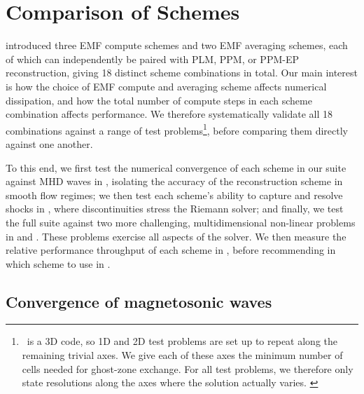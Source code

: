 \section{Comparison of Schemes}
\label{sec:scheme-comparisons}

 introduced three EMF compute schemes and two EMF averaging schemes, each of which can independently be paired with PLM, PPM, or PPM-EP reconstruction, giving 18 distinct scheme combinations in total. Our main interest is how the choice of EMF compute and averaging scheme affects numerical dissipation, and how the total number of compute steps in each scheme combination affects performance. We therefore systematically validate all 18 combinations against a range of test problems\footnote{
    \quokka~is a 3D code, so 1D and 2D test problems are set up to repeat along the remaining trivial axes. We give each of these axes the minimum number of cells needed for ghost-zone exchange. For all test problems, we therefore only state resolutions along the axes where the solution actually varies.
    \label{note:quokka:3d}
}, before comparing them directly against one another.

To this end, we first test the numerical convergence of each scheme in our suite against MHD waves in , isolating the accuracy of the reconstruction scheme in smooth flow regimes; we then test each scheme's ability to capture and resolve shocks in , where discontinuities stress the Riemann solver; and finally, we test the full suite against two more challenging, multidimensional non-linear problems in  and . These problems exercise all aspects of the solver. We then measure the relative performance throughput of each scheme in , before recommending in  which scheme to use in \quokka.

\subsection{Convergence of magnetosonic waves}
\label{sec:scheme-comparison:waves}

